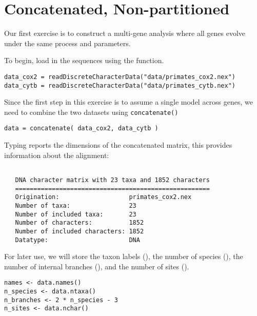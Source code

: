 \section{Concatenated, Non-partitioned}\label{secUnif} 

Our first exercise is to construct a multi-gene analysis where all genes evolve under the same process and parameters.

To begin, load in the sequences using the  function. 
{\tt \begin{snugshade*}
\begin{lstlisting}
data_cox2 = readDiscreteCharacterData("data/primates_cox2.nex")
data_cytb = readDiscreteCharacterData("data/primates_cytb.nex")
\end{lstlisting}
\end{snugshade*}}

Since the first step in this exercise is to assume a single model across genes, we need to combine the two datasets using {\tt concatenate()}

{\tt \begin{snugshade*}
\begin{lstlisting}
data = concatenate( data_cox2, data_cytb )
\end{lstlisting}
\end{snugshade*}}

Typing  reports the dimensions of the concatenated matrix, this provides information about the alignment:


{\tt \begin{snugshade*}
\begin{lstlisting}

   DNA character matrix with 23 taxa and 1852 characters
   =====================================================
   Origination:                   primates_cox2.nex
   Number of taxa:                23
   Number of included taxa:       23
   Number of characters:          1852
   Number of included characters: 1852
   Datatype:                      DNA

\end{lstlisting}
\end{snugshade*}}

For later use, we will store the taxon labels (), the number of species (), the number of internal branches (), and the number of sites ().

{\tt \begin{snugshade*}
\begin{lstlisting}
names <- data.names()
n_species <- data.ntaxa()
n_branches <- 2 * n_species - 3
n_sites <- data.nchar()
\end{lstlisting}
\end{snugshade*}}


